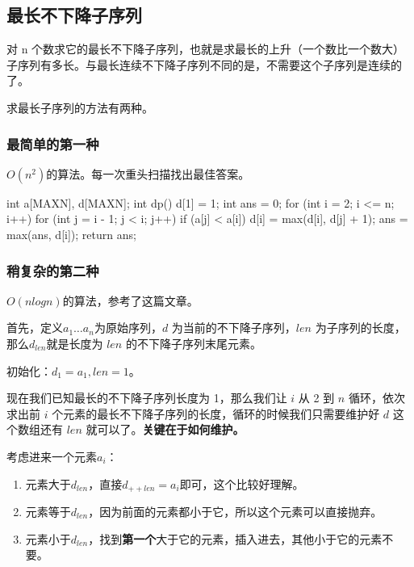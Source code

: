 \subsection{最长不下降子序列}

对 n 个数求它的最长不下降子序列，也就是求最长的上升（一个数比一个数大）子序列有多长。与最长连续不下降子序列不同的是，不需要这个子序列是连续的了。

求最长子序列的方法有两种。

\subsubsection{最简单的第一种}

$O\left(n^2\right)$的算法。每一次重头扫描找出最佳答案。

\begin{cppcode}
int a[MAXN], d[MAXN];
int dp() {
  d[1] = 1;
  int ans = 0;
  for (int i = 2; i <= n; i++) {
    for (int j = i - 1; j < i; j++)
      if (a[j] < a[i]) {
        d[i] = max(d[i], d[j] + 1);
        ans = max(ans, d[i]);
      }
  }
  return ans;
}
\end{cppcode}

\subsubsection{稍复杂的第二种}

$O\left(n log n\right)$的算法，参考了这篇文章\href{https://www.cnblogs.com/itlqs/p/5743114.html}{}。

首先，定义$a_1 \dots a_n$为原始序列，$d$ 为当前的不下降子序列，$len$ 为子序列的长度，那么$d_{len}$就是长度为 $len$ 的不下降子序列末尾元素。

初始化：$d_1=a_1,len=1$。

现在我们已知最长的不下降子序列长度为 1，那么我们让 $i$ 从 2 到 $n$ 循环，依次求出前 $i$ 个元素的最长不下降子序列的长度，循环的时候我们只需要维护好 $d$ 这个数组还有 $len$ 就可以了。\textbf{关键在于如何维护。}

考虑进来一个元素$a_i$：

\begin{enumerate}
\item 元素大于$d_{len}$，直接$d_{++len}=a_i$即可，这个比较好理解。
\item 元素等于$d_{len}$，因为前面的元素都小于它，所以这个元素可以直接抛弃。
\item 元素小于$d_{len}$，找到\textbf{第一个}大于它的元素，插入进去，其他小于它的元素不要。
\end{enumerate}

